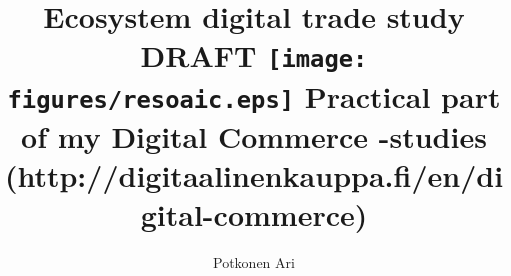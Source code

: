 \documentclass[a5paper,final]{memoir}
\begin{document}
\title{\Huge\textbf{Ecosystem}
\linebreak digital trade \linebreak study \linebreak\linebreak DRAFT \linebreak
\linebreak \linebreak
\texttt{[image: figures/resoaic.eps]} \linebreak
\linebreak
\small
Practical part of my Digital Commerce -studies\linebreak
(http://digitaalinenkauppa.fi/en/digital-commerce)
}
\author{\Large Potkonen Ari}
\maketitle
\pagebreak
\pagestyle{plain}
\parindent 0pt
\setcounter{page}{1}
\pagebreak %
\tableofcontents
\listoffigures
\vspace*{\fill}
\pagebreak %
\pagestyle{headings}
\setcounter{page}{1}
\parindent 0pt
\printindex
%
%
\printbibliography
\pagestyle{plain}
\end{document}
